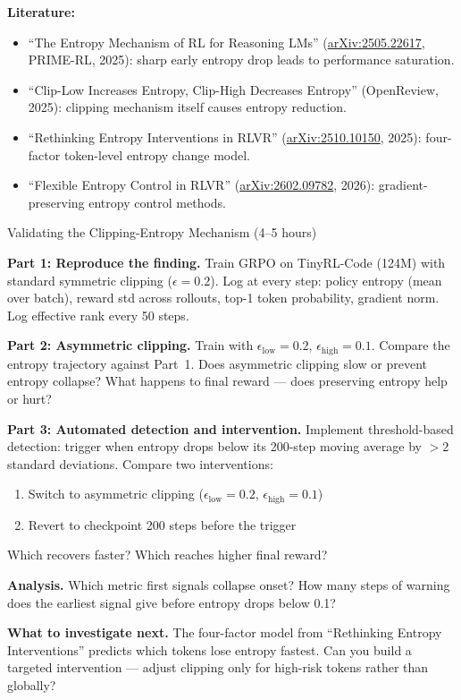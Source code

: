 \textbf{Literature:}
\begin{itemize}
  \item ``The Entropy Mechanism of RL for Reasoning LMs'' (\href{https://arxiv.org/abs/2505.22617}{arXiv:2505.22617}, PRIME-RL, 2025): sharp early entropy drop leads to performance saturation.
  \item ``Clip-Low Increases Entropy, Clip-High Decreases Entropy'' (OpenReview, 2025): clipping mechanism itself causes entropy reduction.
  \item ``Rethinking Entropy Interventions in RLVR'' (\href{https://arxiv.org/abs/2510.10150}{arXiv:2510.10150}, 2025): four-factor token-level entropy change model.
  \item ``Flexible Entropy Control in RLVR'' (\href{https://arxiv.org/abs/2602.09782}{arXiv:2602.09782}, 2026): gradient-preserving entropy control methods.
\end{itemize}

\begin{exercise}{Validating the Clipping-Entropy Mechanism (4--5 hours)}

\textbf{Part 1: Reproduce the finding.} Train GRPO on TinyRL-Code (124M) with standard symmetric clipping ($\epsilon = 0.2$). Log at every step: policy entropy (mean over batch), reward std across rollouts, top-1 token probability, gradient norm. Log effective rank every 50 steps.

\textbf{Part 2: Asymmetric clipping.} Train with $\epsilon_{\mathrm{low}} = 0.2$, $\epsilon_{\mathrm{high}} = 0.1$. Compare the entropy trajectory against Part~1. Does asymmetric clipping slow or prevent entropy collapse? What happens to final reward --- does preserving entropy help or hurt?

\textbf{Part 3: Automated detection and intervention.} Implement threshold-based detection: trigger when entropy drops below its 200-step moving average by $> 2$ standard deviations. Compare two interventions:
\begin{enumerate}[label=(\roman*)]
  \item Switch to asymmetric clipping ($\epsilon_{\mathrm{low}} = 0.2$, $\epsilon_{\mathrm{high}} = 0.1$)
  \item Revert to checkpoint 200 steps before the trigger
\end{enumerate}
Which recovers faster? Which reaches higher final reward?

\textbf{Analysis.} Which metric first signals collapse onset? How many steps of warning does the earliest signal give before entropy drops below 0.1?

\textbf{What to investigate next.} The four-factor model from ``Rethinking Entropy Interventions'' predicts which tokens lose entropy fastest. Can you build a targeted intervention --- adjust clipping only for high-risk tokens rather than globally?
\end{exercise}

